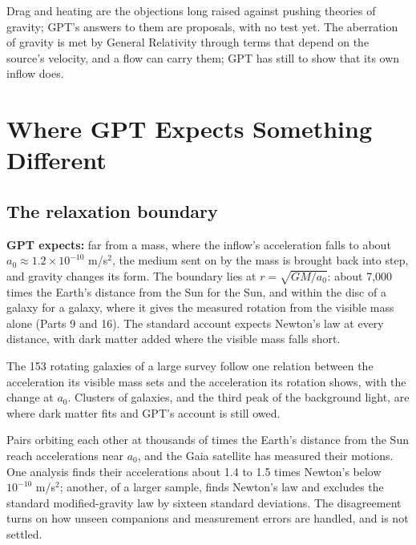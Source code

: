 \nocite{herrmann2009,michelson1887,carlip2000,rashadaPart15,rashadaPart27}

 Drag and heating are the objections long raised against pushing theories of gravity; GPT's answers to them are proposals, with no test yet. The aberration of gravity is met by General Relativity through terms that depend on the source's velocity, and a flow can carry them; GPT has still to show that its own inflow does.


\section{Where GPT Expects Something Different}\label{sec:diverge}

\subsection{The relaxation boundary}\label{sec:boundary}

\begin{hypbar}
\textbf{GPT expects:} far from a mass, where the inflow's acceleration falls to about $a_0 \approx 1.2\times10^{-10}$ m/s$^2$, the medium sent on by the mass is brought back into step, and gravity changes its form. The boundary lies at $r = \sqrt{GM/a_0}$: about 7,000 times the Earth's distance from the Sun for the Sun, and within the disc of a galaxy for a galaxy, where it gives the measured rotation from the visible mass alone (Parts 9 and 16).\footnotemark{} The standard account expects Newton's law at every distance, with dark matter added where the visible mass falls short.
\end{hypbar}

 The 153 rotating galaxies of a large survey follow one relation between the acceleration its visible mass sets and the acceleration its rotation shows, with the change at $a_0$. Clusters of galaxies, and the third peak of the background light, are where dark matter fits and GPT's account is still owed.

 Pairs orbiting each other at thousands of times the Earth's distance from the Sun reach accelerations near $a_0$, and the Gaia satellite has measured their motions. One analysis finds their accelerations about 1.4 to 1.5 times Newton's below $10^{-10}$ m/s$^2$; another, of a larger sample, finds Newton's law and excludes the standard modified-gravity law by sixteen standard deviations. The disagreement turns on how unseen companions and measurement errors are handled, and is not settled.

